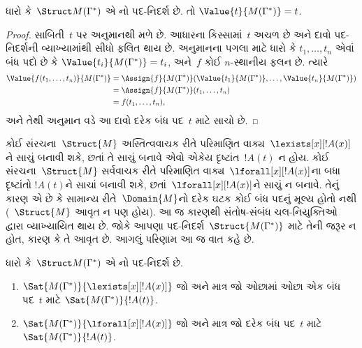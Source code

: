 \begin{lem}
 ધારો કે~$\Struct M(\Gamma^*)$ એ
નો પદ-નિદર્શ છે. તો
$\Value{t}{M(\Gamma^*)}=t$.
\end{lem}
\begin{proof}
 સાબિતી~$t$ પર અનુમાનથી મળે છે. આધારના કિસ્સામાં~$t$ અચળ
 છે અને દાવો પદ-નિદર્શની વ્યાખ્યામાંથી સીધો ફલિત થાય છે. અનુમાનના
 પગલા માટે ધારો કે $t_1,\ldots,t_n$ એવાં બંધ પદો છે કે
 $\Value{t_i}{M(\Gamma^*)}=t_i$, અને~$f$ કોઈ $n$-સ્થાનીય
 ફલન છે. ત્યારે
\begin{align*}
\Value{f(t_1,\ldots,t_n)}{M(\Gamma^*)} &= \Assign{f}{M(\Gamma^*)}(\Value{t_1}
 {M(\Gamma^*)},
\ldots, \Value{t_n}{M(\Gamma^*)}) \\
&= \Assign{f}{M(\Gamma^*)}(t_1, \dots, t_n) \\
&= f(t_1,\dots, t_n),
\end{align*}
અને તેથી અનુમાન વડે આ દાવો દરેક બંધ પદ~$t$ માટે સાચો છે.
\end{proof}


%
\begin{explain}
  કોઈ સંરચના~$\Struct{M}$ અસ્તિત્વવાચક રીતે
    પરિમાણિત વાક્ય~$\lexists[x][!A(x)]$ને સાચું બનાવી શકે,
    છતાં તે સાચું બનાવે એવો એકેય દૃષ્ટાંત~$!A(t)$ ન હોય.
  કોઈ સંરચના~$\Struct{M}$ સર્વવાચક રીતે
    પરિમાણિત વાક્ય~$\lforall[x][!A(x)]$ના બધા દૃષ્ટાંતો
    $!A(t)$ને સાચાં બનાવી શકે, છતાં~$\lforall[x][!A(x)]$ને સાચું ન
    બનાવે. તેનું કારણ એ છે કે સામાન્ય રીતે~$\Domain{M}$નો દરેક
  ઘટક કોઈ બંધ પદનું મૂલ્ય હોતો નથી (~$\Struct{M}$ આવૃત ન પણ
  હોય). આ જ કારણથી સંતોષ-સંબંધ ચલ-નિયુક્તિઓ દ્વારા વ્યાખ્યાયિત થાય છે.
  જોકે આપણા પદ-નિદર્શ~$\Struct{M(\Gamma^*)}$ માટે તેની જરૂર ન હોત,
  કારણ કે તે આવૃત છે. આગલું પરિણામ આ જ વાત કહે છે.
\end{explain}

\begin{prop}
ધારો કે~$\Struct M(\Gamma^*)$ એ નો પદ-નિદર્શ છે.
\begin{enumerate}
\item $\Sat{M(\Gamma^*)}{\lexists[x][!A(x)]}$ જો અને માત્ર જો
  ઓછામાં ઓછા એક બંધ પદ~$t$ માટે $\Sat{M(\Gamma^*)}{!A(t)}$.
\item $\Sat{M(\Gamma^*)}{\lforall[x][!A(x)]}$ જો અને માત્ર
  જો દરેક બંધ પદ~$t$ માટે $\Sat{M(\Gamma^*)}{!A(t)}$.
\end{enumerate}
\end{prop}

